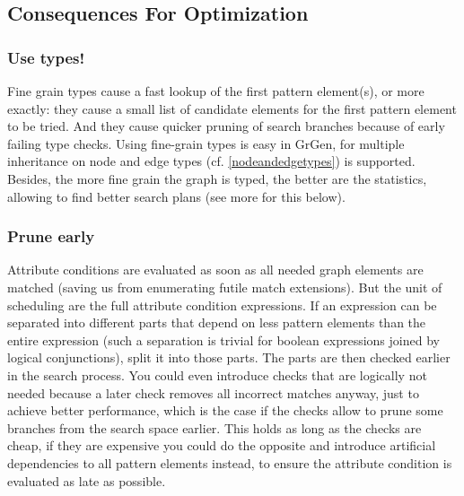 \pagebreak %

\subsection{Consequences For Optimization}

\subsubsection*{Use types!}
Fine grain types cause a fast lookup of the first pattern element(s), or more exactly: they cause a small list of candidate elements for the first pattern element to be tried.
And they cause quicker pruning of search branches because of early failing type checks.
Using fine-grain types is easy in GrGen, for multiple inheritance on node and edge types (cf. \ref{nodeandedgetypes}) is supported.
Besides, the more fine grain the graph is typed, the better are the statistics, allowing \GrG{ } to find better search plans (see more for this below).

\subsubsection*{Prune early}
Attribute conditions are evaluated as soon as all needed graph elements are matched (saving us from enumerating futile match extensions).
But the unit of scheduling are the full attribute condition expressions. 
If an expression can be separated into different parts that depend on less pattern elements than the entire expression (such a separation is trivial for boolean expressions joined by logical conjunctions), split it into those parts.
The parts are then checked earlier in the search process.
You could even introduce checks that are logically not needed because a later check removes all incorrect matches anyway, just to achieve better performance, which is the case if the checks allow to prune some branches from the search space earlier.
This holds as long as the checks are cheap, if they are expensive you could do the opposite and introduce artificial dependencies to all pattern elements instead, to ensure the attribute condition is evaluated as late as possible.


